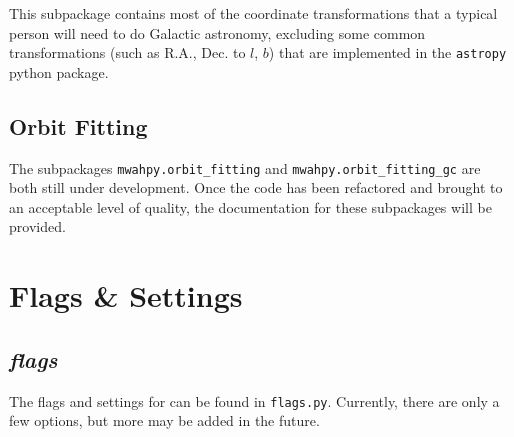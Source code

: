 \documentclass{article}
\begin{document}
This subpackage contains most of the coordinate transformations that a typical person will need to do Galactic astronomy, excluding some common transformations (such as R.A., Dec. to $l$, $b$) that are implemented in the \verb!astropy! python package. 

\subsection{Orbit Fitting}

The subpackages \verb!mwahpy.orbit_fitting! and \verb!mwahpy.orbit_fitting_gc! are both still under development. Once the code has been refactored and brought to an acceptable level of quality, the documentation for these subpackages will be provided. 

\newpage

\section{Flags \& Settings}

\subsection{\textit{flags}}

The flags and settings for \mwahpy can be found in \verb!flags.py!. Currently, there are only a few options, but more may be added in the future. 
\end{document}
